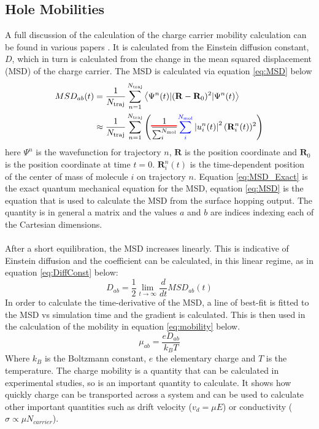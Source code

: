 \subsection{Hole Mobilities}
\label{sect:mobilities}
A full discussion of the calculation of the charge carrier mobility calculation can be found in various papers \cite{Carof2017FSSH,Giannini2018Crossover,Giannini2019}. It is calculated from the Einstein diffusion constant, $D$, which in turn is calculated from the change in the mean squared displacement (MSD) of the charge carrier. The MSD is calculated via equation \eqref{eq:MSD} below
\begin{align}
  \label{eq:MSD_Exact}
  MSD_{ab}(t) &= \frac{1}{N_{\text{traj}}} \sum_{n=1}^{N_{\text{traj}}} \left\langle \Psi^{n}(t) | (\mathbf{R} - \mathbf{R}_{0})^2 | \Psi^{n}(t) \right\rangle \\
	&\approx \frac{1}{N_{\text{traj}}} \sum_{n=1}^{N_{\text{traj}}} \left(\mremove{\frac{1}{\sum_{i}^{N_{\text{mol}}}}}\madd{\sum_{i}^{N_{\text{mol}}}} \left| u^{n}_{i}(t) \right|^2 (\mathbf{R}_{i}^{n}(t))^2 \right)
  \label{eq:MSD}
\end{align}
here $\Psi^{n}$ is the wavefunction for trajectory $n$, $\mathbf{R}$ is the position coordinate and $\mathbf{R}_{0}$ is the position coordinate at time $t=0$. $\mathbf{R}_{i}^{n}(t)$ is the time-dependent position of the center of mass of molecule $i$ on trajectory $n$. Equation \eqref{eq:MSD_Exact} is the exact quantum mechanical equation for the MSD, equation \eqref{eq:MSD} is the equation that is used to calculate the MSD from the surface hopping output. The quantity is in general a  matrix and the values $a$ and $b$ are indices indexing each of the  Cartesian dimensions.
\\\\
After a short equilibration, the MSD increases linearly. This is indicative of Einstein diffusion and the coefficient can be calculated, in this linear regime, as in equation \eqref{eq:DiffConst} below:
\begin{equation}
  D_{ab} = \frac{1}{2} \lim_{t \rightarrow \infty} \frac{d}{dt}MSD_{ab}(t)
  \label{eq:DiffConst}
\end{equation}
In order to calculate the time-derivative of the MSD, a line of best-fit is fitted to the MSD vs simulation time and the gradient is calculated. This is then used in the calculation of the mobility in equation \eqref{eq:mobility} below.
\begin{equation}
	\mu_{ab} = \frac{e D_{ab}}{k_{B} T}
	\label{eq:mobility}
\end{equation}
Where $k_{B}$ is the Boltzmann constant, $e$ the elementary charge and $T$ is the temperature. The charge mobility is a quantity that can be calculated in experimental studies, so is an important quantity to calculate. It shows how quickly charge can be transported across a system and can be used to calculate other important quantities such as drift velocity ($v_{d} = \mu E$) or conductivity ($\sigma \propto \mu N_{carrier}$).
